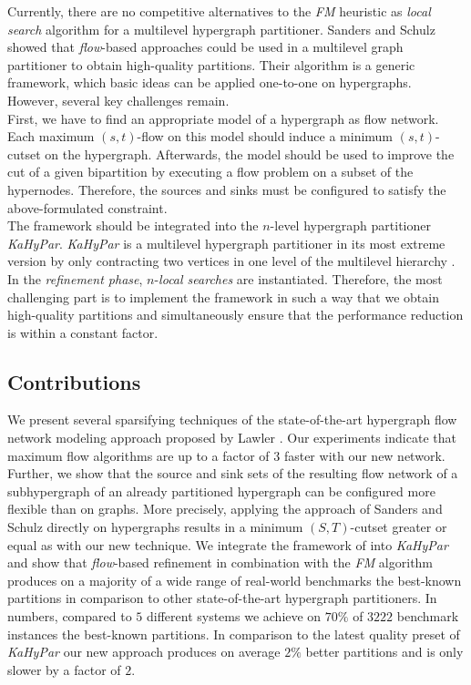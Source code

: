 Currently, there are no competitive alternatives to the \emph{FM} heuristic as \emph{local search}
algorithm for a multilevel hypergraph partitioner. Sanders and Schulz \cite{sanders2011engineering}
showed that \emph{flow}-based approaches could be used in a multilevel graph partitioner to obtain
high-quality partitions. Their algorithm is a generic framework, which basic ideas can be
applied one-to-one on hypergraphs. However, several key challenges remain.\\
First, we have to find an appropriate model of a hypergraph as flow network. Each maximum
$(s,t)$-flow on this model should induce a minimum $(s,t)$-cutset on the hypergraph.
Afterwards, the model should be used to improve the cut of a given bipartition by
executing a flow problem on a subset of the hypernodes. Therefore, the 
sources and sinks must be configured to satisfy the above-formulated constraint. \\
The framework should be integrated into the $n$-level hypergraph partitioner 
\emph{KaHyPar}. \emph{KaHyPar} is a multilevel hypergraph partitioner in its most extreme 
version by only contracting two vertices in one level of the multilevel hierarchy
\cite{akhremtsev2017engineering,heuer2017improving,schlag2016k}. In the \emph{refinement 
phase}, $n$-\emph{local searches} are instantiated. Therefore, the most challenging part is
to implement the framework in such a way that we obtain
high-quality partitions and simultaneously ensure that the performance reduction is within
a constant factor.

\subsection{Contributions}

We present several sparsifying techniques of the state-of-the-art hypergraph flow network
modeling approach proposed by Lawler \cite{lawler1973}. Our experiments indicate that
maximum flow algorithms are up to a factor of $3$ faster with our new network. Further, 
we show that the source and sink sets of the resulting flow network of a subhypergraph 
of an already partitioned hypergraph can be configured more flexible than on graphs. More 
precisely, applying the approach of Sanders and Schulz \cite{sanders2011engineering}
directly on hypergraphs results in a minimum $(S,T)$-cutset greater or equal as with
our new technique. We integrate the framework of \cite{sanders2011engineering} into 
\emph{KaHyPar} and show that \emph{flow}-based refinement in combination with the
\emph{FM} algorithm produces on a majority of a wide range of real-world
benchmarks the best-known partitions in comparison to other state-of-the-art hypergraph
partitioners. In numbers, compared to $5$ different systems we achieve on $70\%$ 
of $3222$ benchmark instances the best-known partitions. In comparison to the 
latest quality preset of \emph{KaHyPar} our new approach produces on average $2\%$ better 
partitions and is only slower by a factor of $2$.

